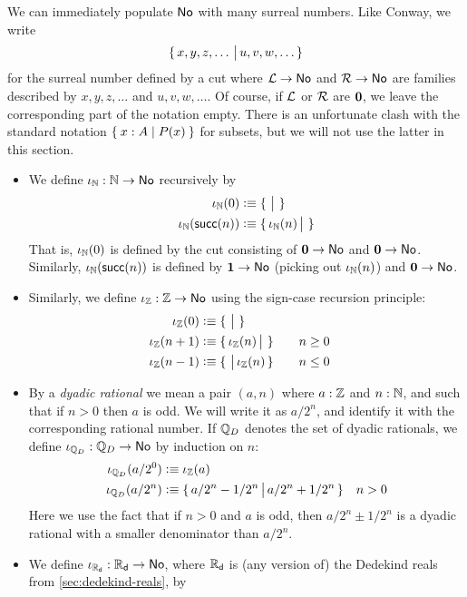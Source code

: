 We can immediately populate $\mathsf{No}$ with many surreal numbers.
Like Conway, we write
\[\{\,x,y,z,\dots\,\big|\,u,v,w,\dots\,\}\]
for the surreal number defined by a cut where $\mathcal{L}\to\mathsf{No}$ and $\mathcal{R}\to\mathsf{No}$ are families described by $x,y,z,\dots$ and $u,v,w,\dots$.
Of course, if $\mathcal{L}$ or $\mathcal{R}$ are $\mathbf{0}$, we leave the corresponding part of the notation empty.
There is an unfortunate clash with the standard notation $\Set{x:A | P(x)}$ for subsets, but we will not use the latter in this section.
\begin{itemize}
\item We define $\iota_{\mathbb{N}}:\mathbb{N}\to\mathsf{No}$ recursively by
  \begin{align*}
    \iota_{\mathbb{N}}(0) &\vcentcolon\equiv \{\,\,\big|\,\,\}\\
    \iota_\mathbb{N}(\mathsf{succ}(n)) &\vcentcolon\equiv \{\,\iota_\mathbb{N}(n)\,\big|\,\,\}
  \end{align*}
  That is, $\iota_\mathbb{N}(0)$ is defined by the cut consisting of $\mathbf{0}\to\mathsf{No}$ and $\mathbf{0}\to\mathsf{No}$.
  Similarly, $\iota_\mathbb{N}(\mathsf{succ}(n))$ is defined by $\mathbf{1}\to\mathsf{No}$ (picking out $\iota_\mathbb{N}(n)$) and $\mathbf{0}\to\mathsf{No}$.
\item Similarly, we define $\iota_{\mathbb{Z}}:\mathbb{Z}\to\mathsf{No}$ using the sign-case recursion principle:
  \begin{alignat*}{2}
    \iota_{\mathbb{Z}}(0) &\vcentcolon\equiv \{\,\,\big|\,\,\}\\
    \iota_\mathbb{Z}(n+1) &\vcentcolon\equiv \{\,\iota_\mathbb{Z}(n)\,\big|\,\,\} &&\quad n\ge 0\\
    \iota_\mathbb{Z}(n-1) &\vcentcolon\equiv \{\,\,\big|\,\iota_\mathbb{Z}(n)\,\} &&\quad n\le 0
  \end{alignat*}
\item By a \emph{dyadic rational} we mean a pair $(a,n)$ where $a:\mathbb{Z}$ and $n:\mathbb{N}$, and such that if $n>0$ then $a$ is odd.
  We will write it as $a/2^n$, and identify it with the corresponding rational number.
  If $\mathbb{Q}_D$ denotes the set of dyadic rationals, we define $\iota_{\mathbb{Q}_D}:\mathbb{Q}_D\to\mathsf{No}$ by induction on $n$:
  \begin{align*}
    \iota_{\mathbb{Q}_D}(a/2^0) &\vcentcolon\equiv \iota_\mathbb{Z}(a)\\
    \iota_{\mathbb{Q}_D}(a/2^n) &\vcentcolon\equiv \{\,a/2^n - 1/2^n\,\big|\,a/2^n + 1/2^n\,\} \quad n>0
  \end{align*}
  Here we use the fact that if $n>0$ and $a$ is odd, then $a/2^n \pm 1/2^n$ is a dyadic rational with a smaller denominator than $a/2^n$.
\item We define $\iota_{\mathbb{R}_\mathsf{d}}:\mathbb{R}_\mathsf{d}\to\mathsf{No}$, where $\mathbb{R}_\mathsf{d}$ is (any version of) the Dedekind reals from \autoref{sec:dedekind-reals}, by
  \begin{align*}

\end{align*}
\end{itemize}
